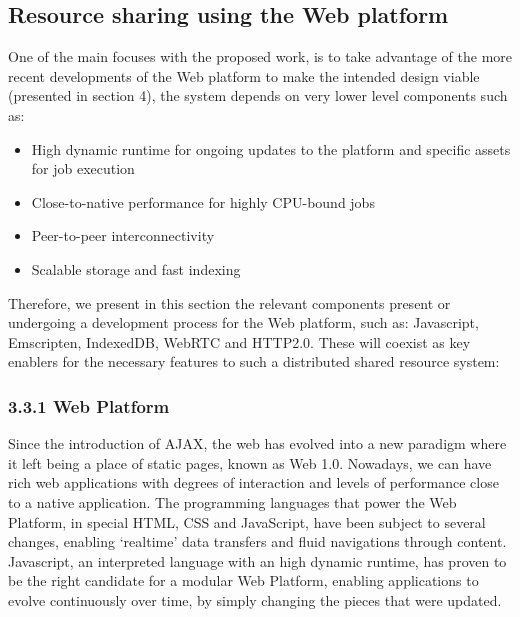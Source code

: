 % 
% 
\subsection{Resource sharing using the Web platform} 

One of the main focuses with the proposed work, is to take advantage of the more recent developments of the Web platform to make the intended design viable (presented in section 4), the system depends on very lower level components such as:
\begin{itemize}
  \item High dynamic runtime for ongoing updates to the platform and specific assets for job execution
  \item Close-to-native performance for highly CPU-bound jobs
  \item Peer-to-peer interconnectivity
  \item Scalable storage and fast indexing
\end{itemize}

Therefore, we present in this section the relevant components present or undergoing a development process for the Web platform, such as: Javascript, Emscripten, IndexedDB, WebRTC and HTTP2.0. These will coexist as key enablers for  the necessary features to such a distributed shared resource system:

\subsubsection{3.3.1 Web Platform}

Since the introduction of AJAX\cite{Google/Mozzila/Opera}, the web has evolved into a new paradigm where it left being a place of static pages, known as Web 1.0. Nowadays, we can have rich web applications with degrees of interaction and levels of performance close to a native application. The programming languages that power the Web Platform, in special HTML, CSS and JavaScript\cite{Ecma2009}, have been subject to several changes, enabling `realtime' data transfers and fluid navigations through content. Javascript, an interpreted language with an high dynamic runtime, has proven to be the right candidate for a modular Web Platform, enabling applications to evolve continuously over time, by simply changing the pieces that were updated.

